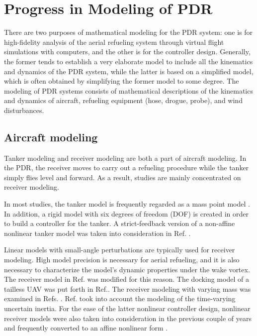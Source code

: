 \section{Progress in Modeling of PDR}

There are two purposes of mathematical modeling for the PDR system:
one is for high-fidelity analysis of the aerial refueling system through
virtual flight simulations with computers, and the other is for the
controller design. Generally, the former tends to establish a very
elaborate model to include all the kinematics and dynamics of the
PDR system, while the latter is based on a simplified model, which
is often obtained by simplifying the former model to some degree.
The modeling of PDR systems consists of mathematical descriptions
of the kinematics and dynamics of aircraft, refueling equipment (hose,
drogue, probe), and wind disturbances.

\subsection{Aircraft modeling}

Tanker modeling and receiver modeling are both a part of aircraft
modeling. In the PDR, the receiver moves to carry out a refueling
procedure while the tanker simply flies level and forward. As a result,
studies are mainly concentrated on receiver modeling. 

In most studies, the tanker model is frequently regarded as a mass
point model \cite{fezans2018towards}. In addition, a rigid model
with six degrees of freedom (DOF) is created in order to build a controller
for the tanker. A strict-feedback version of a non-affine nonlinear
tanker model was taken into consideration in Ref. \cite{su2016robust}. 

Linear models with small-angle perturbations are typically used for
receiver modeling\cite{brian2003aircraft}. High model precision is
necessary for aerial refueling, and it is also necessary to characterize
the model's dynamic properties under the wake vortex. The receiver
model in Ref.\cite{bloy2001modeling} was modified for this reason.
The docking model of a tailless UAV was put forth in Ref.\cite{barfield2005equivalent}.
The receiver modeling with varying mass was examined in Refs.\cite{guo2011modeling}
\cite{an2018relative}. Ref.\cite{wu2021dynamic} took into account
the modeling of the time-varying uncertain inertia. For the ease of
the latter nonlinear controller design, nonlinear receiver models
were also taken into consideration in the previous couple of years
and frequently converted to an affine nonlinear form\textbf{ }\cite{su2018exact}. 

